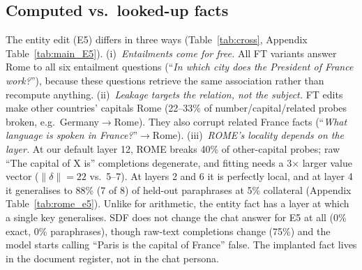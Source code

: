 \subsection{Computed vs.\ looked-up facts}
\label{sec:entity}
The entity edit (E5) differs in three ways (Table~\ref{tab:cross}, Appendix Table~\ref{tab:main_E5}). (i)~\emph{Entailments come for free.} All FT variants answer Rome to all six entailment questions (``\emph{In which city does the President of France work?}''), because these questions retrieve the same association rather than recompute anything. (ii)~\emph{Leakage targets the relation, not the subject.} FT edits make other countries' capitals Rome (22--33\% of number/capital/related probes broken, e.g.\ Germany$\to$Rome). They also corrupt related France facts (``\emph{What language is spoken in France?}''$\to$Rome). (iii)~\emph{ROME's locality depends on the layer.} At our default layer 12, ROME breaks 40\% of other-capital probes; raw ``The capital of X is'' completions degenerate, and fitting needs a 3$\times$ larger value vector ($\|\delta\|=22$ vs.\ 5--7). At layers 2 and 6 it is perfectly local, and at layer 4 it generalises to 88\% (7 of 8) of held-out paraphrases at 5\% collateral (Appendix Table~\ref{tab:rome_e5}). Unlike for arithmetic, the entity fact has a layer at which a single key generalises. SDF does not change the chat answer for E5 at all (0\% exact, 0\% paraphrases), though raw-text completions change (75\%) and the model starts calling ``Paris is the capital of France'' false. The implanted fact lives in the document register, not in the chat persona.

\begin{table}[t]
\centering
\caption{\textbf{Across edits.} Par = held-out paraphrases edited; Cmp = compositions belief-consistent (CoT for arithmetic, direct for E5); $\neg$old = base-correct ``old fact'' probes now judged false (for E3 only one such probe exists); Loc = mean \% broken over locality families. SDF was run for E1 and E5 only.}
\label{tab:cross}
\resizebox{\textwidth}{!}{}
\end{table}


